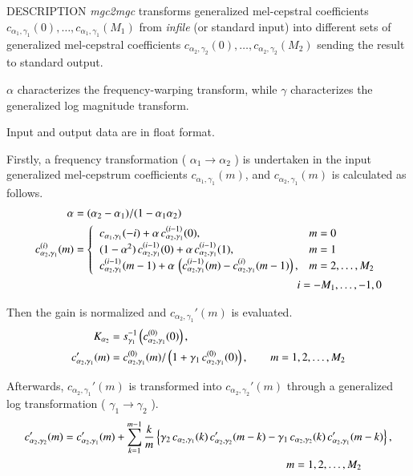 \begin{qsection}{DESCRIPTION}
{\em mgc2mgc} transforms generalized mel-cepstral coefficients
$c_{\alpha_1,\gamma_1}(0),\dots,c_{\alpha_1,\gamma_1}(M_1)$
from {\em infile} (or standard input) 
into different sets of generalized mel-cepstral coefficients
$c_{\alpha_2,\gamma_2}(0),\dots,c_{\alpha_2,\gamma_2}(M_2)$
sending the result to standard output.

$\alpha$ characterizes the frequency-warping transform,
while $\gamma$ characterizes the generalized log magnitude transform.

Input and output data are in float format.

Firstly, a frequency transformation ( $\alpha_1 \rightarrow \alpha_2$ )
is undertaken in the input generalized mel-cepstrum
coefficients $c_{\alpha_1,\gamma_1}(m)$,
and $c_{\alpha_2,\gamma_1}(m)$ is calculated as follows.
\begin{align} 
\alpha &= (\alpha_2-\alpha_1)/(1-\alpha_1\alpha_2) \notag \\
c_{\alpha_2,\gamma_1}^{(i)}(m) &= \begin{cases}
          \;\; c_{\alpha_1,\gamma_1}(-i)
	    +\alpha\,c_{\alpha_2,\gamma_1}^{(i-1)}(0), &  m=0 \\
          \;\; (1-\alpha^2)\,c_{\alpha_2,\gamma_1}^{(i-1)}(0)
            +\alpha\,c_{\alpha_2,\gamma_1}^{(i-1)}(1), &  m=1 \\
          \;\; c_{\alpha_2,\gamma_1}^{(i-1)}(m-1) 
	    +\alpha\, \left(c_{\alpha_2,\gamma_1}^{(i-1)}(m)
	    -c_{\alpha_2,\gamma_1}^{(i)}(m-1)\right), &   m=2,\dots,M_2
         \end{cases} \notag \\
&\hspace{70mm} i = -M_1,\dots,-1,0 \notag
\end{align}

Then the gain is normalized and $c_{\alpha_2,\gamma_1}'(m)$ 
is evaluated.
\begin{align}
K_{\alpha_2} &= 
	s_{\gamma_1}^{-1}\left(c_{\alpha_2,\gamma_1}^{(0)}(0)\right), \notag \\ 
c_{\alpha_2,\gamma_1}'(m) &=
          c_{\alpha_2,\gamma_1}^{(0)}(m)/\left(1+\gamma_1\,
	  c_{\alpha_2,\gamma_1}^{(0)}(0)\right), \qquad m = 1,2,\dots, M_2 \notag
\end{align}

Afterwards, $c_{\alpha_2,\gamma_1}'(m)$ is transformed into 
$c_{\alpha_2,\gamma_2}'(m)$ through a generalized log transformation
( $\gamma_1 \rightarrow \gamma_2$ ).
\begin{align}
c_{\alpha_2,\gamma_2}'(m) &=
        c_{\alpha_2,\gamma_1}'(m)+\sum_{k=1}^{m-1} \frac{k}{m}
          \left\{ \gamma_2\,c_{\alpha_2,\gamma_1}(k)\,
	  c_{\alpha_2,\gamma_2}'(m-k) 
 -\gamma_1\,c_{\alpha_2,\gamma_2}(k)\,
          c_{\alpha_2,\gamma_1}'(m-k) \right\},  \notag \\
	  &\hspace{70mm} m = 1, 2, \dots, M_2 \notag
\end{align}


\end{qsection}
